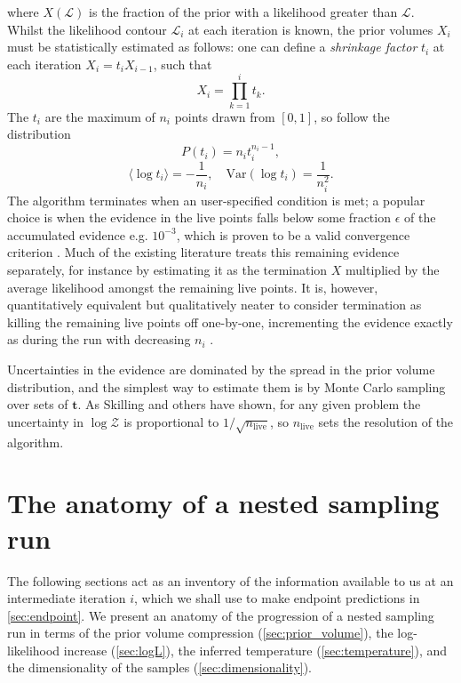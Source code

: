 \documentclass[usenatbib]{mnras}
\newcommand{\nlive}{n_i}
\begin{document}
where $X(\mathcal{L})$ is the fraction of the prior with a likelihood greater than $\mathcal{L}$. Whilst the likelihood contour $\mathcal{L}_i$ at each iteration is known, the prior volumes $X_i$ must be statistically estimated as follows: one can define a \textit{shrinkage factor} $t_i$ at each iteration $X_{i} = t_i X_{i-1}$, such that
\begin{equation}\label{eq:X_dist}
	X_i = \prod_{k=1}^i t_k.
\end{equation}
The $t_i$ are the maximum of $\nlive$ points drawn from $[0,1]$, so follow the distribution
\begin{equation}\label{eq:t_dist}
	P(t_i) = \nlive t_i^{\nlive-1},
\end{equation}
\begin{equation}\label{eq:t_moments}
    \langle\log t_i\rangle = -\frac{1}{\nlive}, \quad \mathrm{Var}(\log t_i) = \frac{1}{\nlive^2}.
\end{equation}
The algorithm terminates when an user-specified condition is met; a popular choice is when the evidence in the live points falls below some fraction $\epsilon$ of the accumulated evidence e.g. $10^{-3}$, which is proven to be a valid convergence criterion \citep{evans, Chopin_2010}.
Much of the existing literature treats this remaining evidence separately, for instance by estimating it as the termination $X$ multiplied by the average likelihood amongst the remaining live points. It is, however, quantitatively equivalent but qualitatively neater to consider termination as killing the remaining live points off one-by-one, incrementing the evidence exactly as during the run with decreasing $\nlive$ \citep{dynesty}.
\par
Uncertainties in the evidence are dominated by the spread in the prior volume distribution, and the simplest way to estimate them is by Monte Carlo sampling over sets of $\bm{t}$. As Skilling and others \citep{Chopin_2010, Keeton_2011} have shown, for any given problem the uncertainty in $\log \mathcal{Z}$ is proportional to $1/\sqrt{n_\mathrm{live}}$, so $n_\mathrm{live}$ sets the resolution of the algorithm.   

\section{The anatomy of a nested sampling run}\label{sec:anatomy}
The following sections act as an inventory of the information available to us at an intermediate iteration $i$, which we shall use to make endpoint predictions in \cref{sec:endpoint}. We present an anatomy of the progression of a nested sampling run in terms of the prior volume compression (\cref{sec:prior_volume}), the log-likelihood increase (\cref{sec:logL}), the inferred temperature (\cref{sec:temperature}), and the dimensionality of the samples (\cref{sec:dimensionality}).
\end{document}
